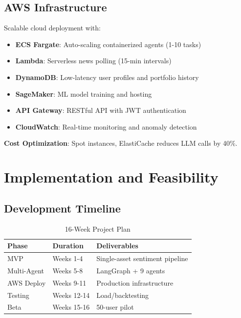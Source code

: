 \documentclass[conference]{IEEEtran}
\begin{document}
    \subsection{AWS Infrastructure}
    Scalable cloud deployment with:
    \begin{itemize}
        \item \textbf{ECS Fargate}: Auto-scaling containerized agents (1-10 tasks)
        \item \textbf{Lambda}: Serverless news polling (15-min intervals)
        \item \textbf{DynamoDB}: Low-latency user profiles and portfolio history
        \item \textbf{SageMaker}: ML model training and hosting
        \item \textbf{API Gateway}: RESTful API with JWT authentication
        \item \textbf{CloudWatch}: Real-time monitoring and anomaly detection
    \end{itemize}
    \textbf{Cost Optimization}: Spot instances, ElastiCache reduces LLM calls by 40\%.

    \section{Implementation and Feasibility}

    \subsection{Development Timeline}
    \begin{table}[htbp]
    \caption{16-Week Project Plan}
    \begin{center}
    \scriptsize
    \begin{tabular}{|l|l|p{3cm}|}
    \hline
    \textbf{Phase} & \textbf{Duration} & \textbf{Deliverables} \\
    \hline
    MVP & Weeks 1-4 & Single-asset sentiment pipeline \\
    \hline
    Multi-Agent & Weeks 5-8 & LangGraph + 9 agents \\
    \hline
    AWS Deploy & Weeks 9-11 & Production infrastructure \\
    \hline
    Testing & Weeks 12-14 & Load/backtesting \\
    \hline
    Beta & Weeks 15-16 & 50-user pilot \\
    \hline
    \end{tabular}
    \label{tab:timeline}
    \end{center}
    \end{table}
\end{document}
